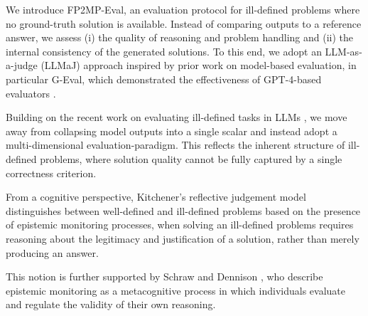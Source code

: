 We introduce FP2MP-Eval, an evaluation protocol for ill-defined problems where no ground-truth solution is available.
Instead of comparing outputs to a reference answer, we assess (i) the quality of reasoning and problem handling and (ii) the internal consistency of the generated solutions.
To this end, we adopt an LLM-as-a-judge (LLMaJ) approach inspired by prior work on model-based evaluation, in particular G-Eval, which demonstrated the effectiveness of GPT-4-based evaluators \cite{liu2023g}.

Building on the recent work on evaluating ill-defined tasks in LLMs \cite{zhou2026evaluating}, we move away from collapsing model outputs into a single scalar and instead adopt a multi-dimensional evaluation-paradigm. This reflects the inherent structure of ill-defined problems, where solution quality cannot be fully captured by a single correctness criterion.

From a cognitive perspective, Kitchener's reflective judgement model \cite{kitchner1983cognition} distinguishes between well-defined and ill-defined problems based on the presence of epistemic monitoring processes, when solving an ill-defined problems requires reasoning about the legitimacy and justification of a solution, rather than merely producing an answer.

This notion is further supported by Schraw and Dennison \cite{schraw1995cognitive}, who describe epistemic monitoring as a metacognitive process in which individuals evaluate and regulate the validity of their own reasoning.